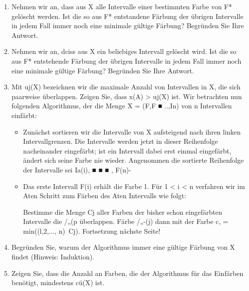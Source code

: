 \documentclass{lehramt-informatik-aufgabe}
\begin{document}
\begin{enumerate}


\item Nehmen wir an, dass aus X alle Intervalle einer bestimmten Farbe
von F* gelöscht werden. Ist die so aus F* entstandene Färbung der
übrigen Intervalle in jedem Fall immer noch eine minimale gültige
Färbung? Begründen Sie Ihre Antwort.


\item Nehmen wir an, dciss aus X ein beliebiges Intervall gelöscht wird.
Ist die so aus F* entstehende Färbung der übrigen Intervalle in jedem
Fall immer noch eine minimale gültige Färbung? Begründen Sie Ihre
Antwort.


\item Mit uj(X) bezeichnen wir die maximale Anzahl von Intervallen in X,
die sich paarweise überlappen. Zeigen Sie, dass x(A) > uj(X) ist. Wir
betrachten nun folgenden Algorithmus, der die Menge X = (F,F ■ ..,In)
von n Intervallen einfärbt:

\begin{itemize}
\item Zunächst sortieren wir die Intervalle von X aufsteigend nach ihren
linken Intervallgrenzen. Die Intervalle werden jetzt in dieser
Reihenfolge nacheinander eingefärbt; ist ein Intervall dabei erst einmal
eingefärbt, ändert sich seine Farbe nie wieder. Angenommen die sortierte
Reihenfolge der Intervalle sei Ia(i), ■ ■ ■ , F(n)-

\item Das erste Intervall F(i) erhält die Farbe 1. Für 1 < i < n
verfahren wir im Aten Schritt zum Färben des Aten Intervalls wie folgt:

Bestimme die Menge Cj aller Farben der bisher schon eingefärbten
Intervalle die /„(p überlappen. Färbe /„-(j) dann mit der Farbe c, =
min((l,2,..., n)\ Cj). Fortsetzung nächste Seite!
\end{itemize}


\item Begründen Sie, warum der Algorithmus immer eine gültige Färbung
von X findet (Hinweis: Induktion).


\item Zeigen Sie, dass die Anzahl an Farben, die der Algorithmus für das
Einfärben benötigt, mindestens cü(X) ist.


\end{enumerate}
\end{document}
